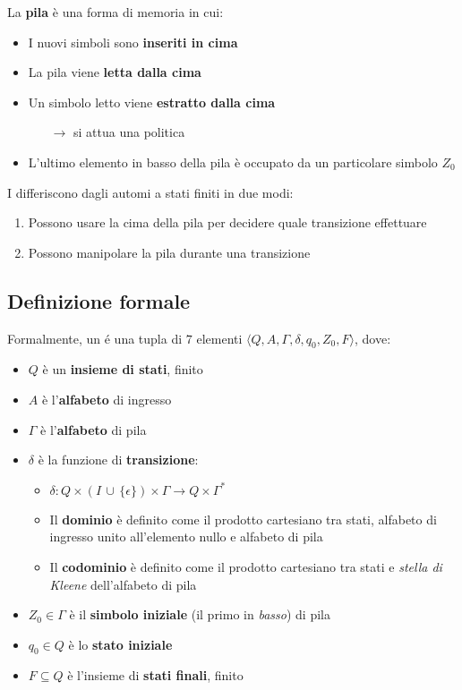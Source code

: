 \documentclass[italian, 10pt]{article}
\begin{document}
La \textbf{pila} è una forma di memoria in cui:

\begin{itemize}
  \item I nuovi simboli sono \textbf{inseriti in cima}
  \item La pila viene \textbf{letta dalla cima}
  \item Un simbolo letto viene \textbf{estratto dalla cima}
        \begin{itemize}
          \item[\(\rightarrow\)] si attua una politica \LIFO
        \end{itemize}
  \item L'ultimo elemento in basso della pila è occupato da un particolare simbolo \(Z_0\)
\end{itemize}

I \PDA differiscono dagli automi a stati finiti in due modi:

\begin{enumerate}
  \item Possono usare la cima della pila per decidere quale transizione effettuare
  \item Possono manipolare la pila durante una transizione
\end{enumerate}

\subsection{Definizione formale \PDA}
\label{sec:definizione-formale-PDA}

Formalmente, un \PDA é una tupla di \(7\) elementi \( \langle Q, A, \Gamma, \delta, q_0, Z_0, F \rangle \), dove:

\begin{itemize}
  \item \(Q\) è un \textbf{insieme di stati}, finito
  \item \(A\) è l'\textbf{alfabeto} di ingresso
  \item \(\Gamma\) è l'\textbf{alfabeto} di pila
  \item \(\delta\) è la funzione di \textbf{transizione}:
        \begin{itemize}
          \item \(\delta: Q \times \left(I \, \cup \, \{\epsilon\} \right) \times \Gamma \rightarrow Q \times \Gamma^\ast\)
          \item Il \textbf{dominio} è definito come il prodotto cartesiano tra stati, alfabeto di ingresso unito all'elemento nullo e alfabeto di pila
          \item Il \textbf{codominio} è definito come il prodotto cartesiano tra stati e \textit{stella di Kleene} dell'alfabeto di pila
        \end{itemize}
  \item \(Z_0 \in \Gamma\) è il \textbf{simbolo iniziale} (il primo in \textit{basso}) di pila
  \item \(q_0 \in Q\) è lo \textbf{stato iniziale}
  \item \(F \subseteq Q\) è l'insieme di \textbf{stati finali}, finito
\end{itemize}
\end{document}
